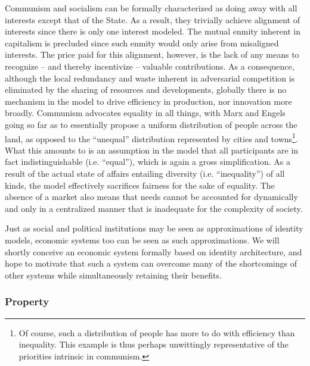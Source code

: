 \documentclass[pra,twocolumn,groupedaddress,10pt]{revtex4}
\theoremstyle{definition}
\begin{document}
Communism and socialism can be formally characterized as doing away with all interests except that of the State. As a result, they trivially achieve alignment of interests since there is only one interest modeled. The mutual enmity inherent in capitalism is precluded since such enmity would only arise from misaligned interests. The price paid for this alignment, however, is the lack of any means to recognize -- and thereby incentivize -- valuable contributions. As a consequence, although the local redundancy and waste inherent in adversarial competition is eliminated by the sharing of resources and developments, globally there is no mechanism in the model to drive efficiency in production, nor innovation more broadly. Communism advocates equality in all things, with Marx and Engels\cite{marx} going so far as to essentially propose a uniform distribution of people across the land, as opposed to the ``unequal'' distribution represented by cities and towns\footnote{Of course, such a distribution of people has more to do with efficiency than inequality. This example is thus perhaps unwittingly representative of the priorities intrinsic in communism.}. What this amounts to is an assumption in the model that all participants are in fact indistinguishable (i.e. ``equal''), which is again a gross simplification. As a result of the actual state of affairs entailing diversity (i.e. ``inequality'') of all kinds, the model effectively sacrifices fairness for the sake of equality. The absence of a market also means that needs cannot be accounted for dynamically and only in a centralized manner that is inadequate for the complexity of society.

Just as social and political institutions may be seen as approximations of identity models, economic systems too can be seen as such approximations. We will shortly conceive an economic system formally based on identity architecture, and hope to motivate that such a system can overcome many of the shortcomings of other systems while simultaneously retaining their benefits.

\subsubsection{Property}
\end{document}
